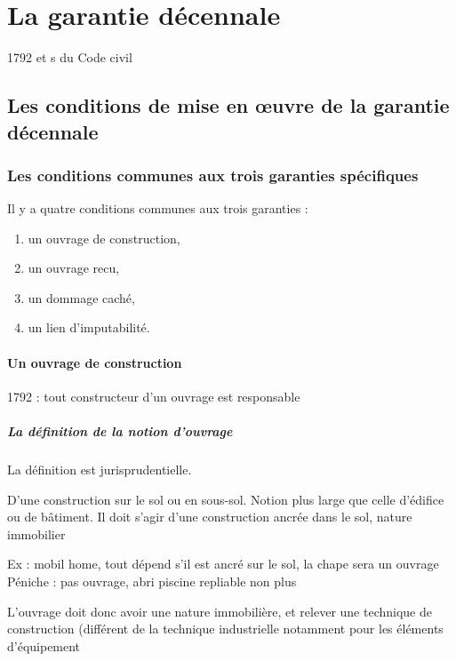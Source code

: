 \section{La garantie décennale}

	1792 et s du Code civil

	\subsection{Les conditions de mise en œuvre de la garantie décennale}

		\subsubsection{Les conditions communes aux trois garanties spécifiques}\label{garantiesSpecifiquesConditions}

			Il y a quatre conditions communes aux trois garanties :
			\begin{enumerate}
				\item un ouvrage de construction,
				\item un ouvrage recu,
				\item un dommage caché,
				\item un lien d'imputabilité.
			\end{enumerate}

			\paragraph{Un ouvrage de construction}

				1792 : tout constructeur d’un ouvrage est responsable

				\subparagraph{La définition de la notion d'ouvrage}

				La définition est jurisprudentielle.

				D’une construction sur le sol ou en sous-sol. Notion plus large que celle d’édifice ou de bâtiment. Il doit s’agir d’une construction ancrée dans le sol, nature immobilier

				Ex : mobil home, tout dépend s’il est ancré sur le sol, la chape sera un ouvrage
				Péniche : pas ouvrage, abri piscine repliable non plus

				L’ouvrage doit donc avoir une nature immobilière, et relever une technique de construction (différent de la technique industrielle notamment pour les éléments d’équipement


